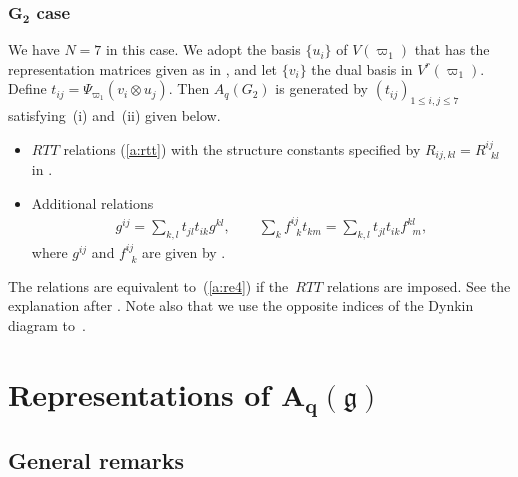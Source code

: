 \documentclass[pdftex]{sigma}
\newcommand{\geh}{\mathfrak{g}}
\begin{document}
\subsubsection[$G_2$ case]{$\boldsymbol{G_2}$ case}\label{a:sss:g1}

We have $N=7$ in this case. We adopt the basis $\{u_i\}$ of $V(\varpi_1)$ that has the
representation matrices given as in \cite[equation~(29)]{Sasaki}, and let $\{v_i\}$ the dual basis
in $V^r(\varpi_1)$. Def\/ine $t_{ij}=\Psi_{\varpi_1}(v_i \otimes u_j)$. Then
$A_q(G_2)$ is generated by $(t_{ij})_{1\le i,j \le 7}$ satisfying~(i) and~(ii) given below.
\begin{itemize}\itemsep=0pt
\item[(i)] $RTT$ relations (\ref{a:rtt})
with the structure constants specif\/ied by
$R_{ij,kl} = R^{ij}_{\;\;kl}$ in \cite[equation~(33)]{Sasaki}.
%
\item[(ii)] Additional relations
\begin{gather}\label{a:re4}
g^{ij} = \sum_{k,l}t_{jl}t_{ik}g^{kl},\qquad
\sum_k f^{ij}_{\;\;k} t_{km} = \sum_{k,l}t_{jl}t_{ik} f^{k l}_{\;\;m},
\end{gather}
where $g^{ij}$ and $f^{ij}_{\;\;k}$ are
given by \cite[equations~(30), (31)]{Sasaki}.
\end{itemize}
The relations \cite[equations~(20), (22)]{Sasaki} are
equivalent to~(\ref{a:re4})  if the~$RTT$ relations are imposed.
See the explanation after \cite[Def\/inition~7]{Sasaki}.
Note also that we use the opposite indices of the Dynkin diagram to~\cite{Sasaki}.



\section[Representations of $A_q(\geh)$]{Representations of $\boldsymbol{A_q(\geh)}$}\label{a:sec4}


\subsection{General remarks}\label{a:ss:gr}
\end{document}
